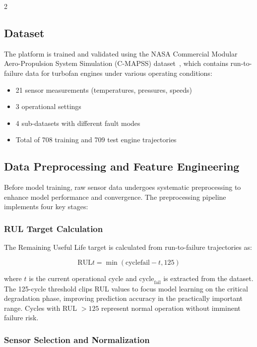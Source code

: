 \documentclass{ijceds} %
\begin{document}
\begin{multicols}{2}
\subsection{Dataset}

The platform is trained and validated using the NASA Commercial Modular Aero-Propulsion System Simulation (C-MAPSS) dataset~\cite{saxena2008turbofan}, which contains run-to-failure data for turbofan engines under various operating conditions:

\begin{itemize}
    \item 21 sensor measurements (temperatures, pressures, speeds)
    \item 3 operational settings
    \item 4 sub-datasets with different fault modes
    \item Total of 708 training and 709 test engine trajectories
\end{itemize}


\subsection{Data Preprocessing and Feature Engineering}
\label{sec:preprocessing}

Before model training, raw sensor data undergoes systematic preprocessing to enhance model performance and convergence. The preprocessing pipeline implements four key stages:

\subsubsection{RUL Target Calculation}

The Remaining Useful Life target is calculated from run-to-failure trajectories as:

\begin{equation}
    \text{RUL}t = \min(\text{cycle}{\text{fail}} - t, 125)
    \label{eq:rul-calc}
\end{equation}

where $t$ is the current operational cycle and $\text{cycle}_{\text{fail}}$ is extracted from the dataset. The 125-cycle threshold clips RUL values to focus model learning on the critical degradation phase, improving prediction accuracy in the practically important range. Cycles with RUL $> 125$ represent normal operation without imminent failure risk.

\subsubsection{Sensor Selection and Normalization}


\end{multicols}
\end{document}
